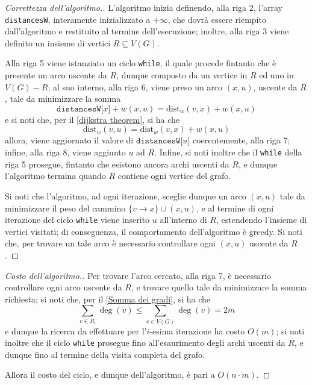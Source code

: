 \documentclass[a4paper, 12pt]{report}
\begin{document}
    \begin{proof}[Correttezza dell'algoritmo.]
        L'algoritmo inizia definendo, alla riga 2, l'array \texttt{distancesW}, interamente inizializzato a $+ \infty$, che dovrà essere riempito dall'algoritmo e restituito al termine dell'esecuzione; inoltre, alla riga 3 viene definito un insieme di vertici $R \subseteq V(G)$.

        Alla riga 5 viene istanziato un ciclo \texttt{while}, il quale procede fintanto che è presente un arco uscente da $R$, dunque composto da un vertice in $R$ ed uno in $V(G) - R$; al suo interno, alla riga 6, viene preso un arco $(x, u)$, uscente da $R$, tale da minimizzare la somma $$\texttt{distancesW[}x\texttt{]} + w(x, u) = \mathrm{dist}_w(v, x) + w(x, u)$$ e si noti che, per il \cref{dijkstra theorem}, si ha che $$\mathrm{dist}_w(v, u) = \mathrm{dist}_w(v, x) + w(x, u)$$ allora, viene aggiornato il valore di $\texttt{distancesW[}u\texttt{]}$ coerentemente, alla riga 7; infine, alla riga 8, viene aggiunto $u$ ad $R$. Infine, si noti inoltre che il \texttt{while} della riga 5 prosegue, fintanto che esistono ancora archi uscenti da $R$, e dunque l'algoritmo termina quando $R$ contiene ogni vertice del grafo.

        Si noti che l'algoritmo, ad ogni iterazione, sceglie dunque un arco $(x, u)$ tale da minimizzare il peso del cammino $\{v \rightarrow x\} \cup (x, u)$, e al termine di ogni iterazione del ciclo \texttt{while} viene inserito $u$ all'interno di $R$, estendendo l'insieme di vertici visitati; di conseguenza, il comportamento dell'algoritmo è greedy. Si noti che, per trovare un tale arco è necessario controllare ogni $(x, u)$ uscente da $R$.
    \end{proof}

    \begin{proof}[Costo dell'algoritmo.]
        Per trovare l'arco cercato, alla riga 7, è necessario controllare ogni arco uscente da $R$, e trovare quello tale da minimizzare la somma richiesta; si noti che, per il \cref{Somma dei gradi}, si ha che $$\displaystyle \sum_{v \in R_i}{\deg(v)} \le \sum_{v \in V(G)}{\deg(v)} = 2m$$ e dunque la ricerca da effettuare per l'$i$-esima iterazione ha costo $O(m)$; si noti inoltre che il ciclo \texttt{while} prosegue fino all'esaurimento degli archi uscenti da $R$, e dunque fino al termine della visita completa del grafo.

        Allora il costo del ciclo, e dunque dell'algoritmo, è pari a $O(n \cdot m)$.
    \end{proof}
\end{document}
